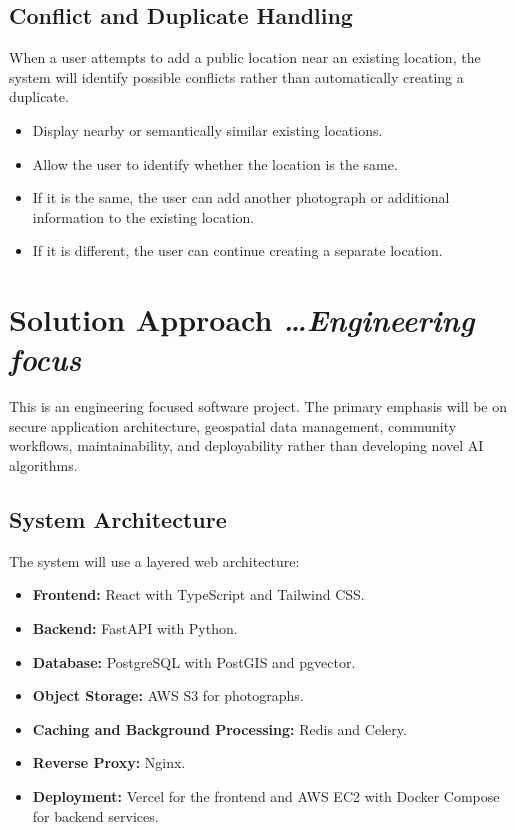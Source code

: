 \documentclass[11pt,a4paper]{article}
\newcommand{\BvrHint}[1]{%
  {\normalfont\normalsize\itshape\hfill #1}}
\begin{document}
\subsection{Conflict and Duplicate Handling}

When a user attempts to add a public location near an existing location, the
system will identify possible conflicts rather than automatically creating
a duplicate.

\begin{itemize}[leftmargin=0.7cm]
    \item Display nearby or semantically similar existing locations.
    \item Allow the user to identify whether the location is the same.
    \item If it is the same, the user can add another photograph or additional
    information to the existing location.
    \item If it is different, the user can continue creating a separate
    location.
\end{itemize}

\section{Solution Approach%
  \BvrHint{\ldots Engineering focus}}

This is an engineering focused software project. The primary emphasis will
be on secure application architecture, geospatial data management, community
workflows, maintainability, and deployability rather than developing novel
AI algorithms.

\subsection{System Architecture}

The system will use a layered web architecture:

\begin{itemize}[leftmargin=0.7cm]
    \item \textbf{Frontend:} React with TypeScript and Tailwind CSS.
    \item \textbf{Backend:} FastAPI with Python.
    \item \textbf{Database:} PostgreSQL with PostGIS and pgvector.
    \item \textbf{Object Storage:} AWS S3 for photographs.
    \item \textbf{Caching and Background Processing:} Redis and Celery.
    \item \textbf{Reverse Proxy:} Nginx.
    \item \textbf{Deployment:} Vercel for the frontend and AWS EC2 with
    Docker Compose for backend services.
\end{itemize}
\end{document}
